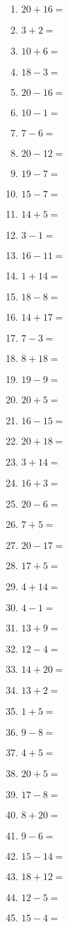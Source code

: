 \documentclass[11pt]{article}\usepackage[a4paper,margin=0.90in,tmargin=0.5in]{geometry}\usepackage{amsmath, amsthm, amssymb}
\begin{document}
\begin{multicols}{4}
\begin{enumerate}[itemsep=0.45\baselineskip]
\item $20 + 16 =$ 
\item $3 + 2 =$ 
\item $10 + 6 =$ 
\item $18 - 3 =$ 
\item $20 - 16 =$ 
\item $10 - 1 =$ 
\item $7 - 6 =$ 
\item $20 - 12 =$ 
\item $19 - 7 =$ 
\item $15 - 7 =$ 
\item $14 + 5 =$ 
\item $3 - 1 =$ 
\item $16 - 11 =$ 
\item $1 + 14 =$ 
\item $18 - 8 =$ 
\item $14 + 17 =$ 
\item $7 - 3 =$ 
\item $8 + 18 =$ 
\item $19 - 9 =$ 
\item $20 + 5 =$ 
\item $16 - 15 =$ 
\item $20 + 18 =$ 
\item $3 + 14 =$ 
\item $16 + 3 =$ 
\item $20 - 6 =$ 
\item $7 + 5 =$ 
\item $20 - 17 =$ 
\item $17 + 5 =$ 
\item $4 + 14 =$ 
\item $4 - 1 =$ 
\item $13 + 9 =$ 
\item $12 - 4 =$ 
\item $14 + 20 =$ 
\item $13 + 2 =$ 
\item $1 + 5 =$ 
\item $9 - 8 =$ 
\item $4 + 5 =$ 
\item $20 + 5 =$ 
\item $17 - 8 =$ 
\item $8 + 20 =$ 
\item $9 - 6 =$ 
\item $15 - 14 =$ 
\item $18 + 12 =$ 
\item $12 - 5 =$ 
\item $15 - 4 =$ 

\end{enumerate}
\end{multicols}
\end{document}
